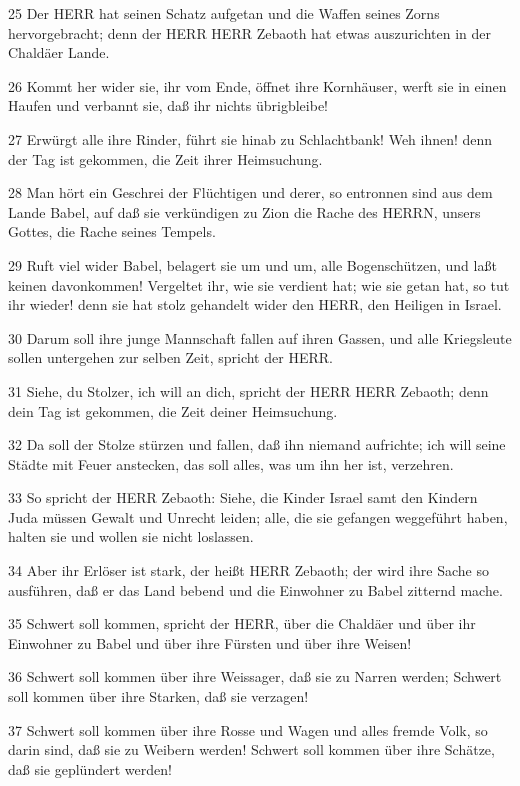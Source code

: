 \par 25 Der HERR hat seinen Schatz aufgetan und die Waffen seines Zorns hervorgebracht; denn der HERR HERR Zebaoth hat etwas auszurichten in der Chaldäer Lande.
\par 26 Kommt her wider sie, ihr vom Ende, öffnet ihre Kornhäuser, werft sie in einen Haufen und verbannt sie, daß ihr nichts übrigbleibe!
\par 27 Erwürgt alle ihre Rinder, führt sie hinab zu Schlachtbank! Weh ihnen! denn der Tag ist gekommen, die Zeit ihrer Heimsuchung.
\par 28 Man hört ein Geschrei der Flüchtigen und derer, so entronnen sind aus dem Lande Babel, auf daß sie verkündigen zu Zion die Rache des HERRN, unsers Gottes, die Rache seines Tempels.
\par 29 Ruft viel wider Babel, belagert sie um und um, alle Bogenschützen, und laßt keinen davonkommen! Vergeltet ihr, wie sie verdient hat; wie sie getan hat, so tut ihr wieder! denn sie hat stolz gehandelt wider den HERR, den Heiligen in Israel.
\par 30 Darum soll ihre junge Mannschaft fallen auf ihren Gassen, und alle Kriegsleute sollen untergehen zur selben Zeit, spricht der HERR.
\par 31 Siehe, du Stolzer, ich will an dich, spricht der HERR HERR Zebaoth; denn dein Tag ist gekommen, die Zeit deiner Heimsuchung.
\par 32 Da soll der Stolze stürzen und fallen, daß ihn niemand aufrichte; ich will seine Städte mit Feuer anstecken, das soll alles, was um ihn her ist, verzehren.
\par 33 So spricht der HERR Zebaoth: Siehe, die Kinder Israel samt den Kindern Juda müssen Gewalt und Unrecht leiden; alle, die sie gefangen weggeführt haben, halten sie und wollen sie nicht loslassen.
\par 34 Aber ihr Erlöser ist stark, der heißt HERR Zebaoth; der wird ihre Sache so ausführen, daß er das Land bebend und die Einwohner zu Babel zitternd mache.
\par 35 Schwert soll kommen, spricht der HERR, über die Chaldäer und über ihr Einwohner zu Babel und über ihre Fürsten und über ihre Weisen!
\par 36 Schwert soll kommen über ihre Weissager, daß sie zu Narren werden; Schwert soll kommen über ihre Starken, daß sie verzagen!
\par 37 Schwert soll kommen über ihre Rosse und Wagen und alles fremde Volk, so darin sind, daß sie zu Weibern werden! Schwert soll kommen über ihre Schätze, daß sie geplündert werden!
